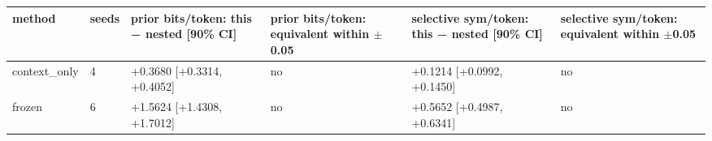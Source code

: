 \begin{tabular}{llllll}
\hline
method & seeds & prior bits/token: this − nested [90\% CI] & prior bits/token: equivalent within $\pm$0.05 & selective sym/token: this − nested [90\% CI] & selective sym/token: equivalent within $\pm$0.05 \\
\hline
context\_only & 4 & +0.3680 [+0.3314, +0.4052] & no & +0.1214 [+0.0992, +0.1450] & no \\
frozen & 6 & +1.5624 [+1.4308, +1.7012] & no & +0.5652 [+0.4987, +0.6341] & no \\
\hline
\end{tabular}

